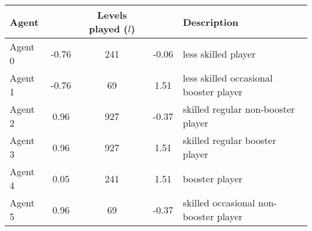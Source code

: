    \begin{tabular}{l S c S l }
    \toprule
    
    Agent &  &  Levels played ($l$) &  & Description \\

    \midrule
    Agent 0 & -0.76  & 241 & -0.06   & less skilled player \\ 
    Agent 1 & -0.76  & 69  & 1.51    & less skilled occasional booster player \\ 
    Agent 2 & 0.96   & 927 & -0.37   & skilled regular non-booster player \\ 
    Agent 3 & 0.96   & 927 & 1.51    & skilled regular booster player \\ 
    Agent 4 & 0.05   & 241 & 1.51    & booster player \\ 
    Agent 5 & 0.96   & 69  & -0.37   & skilled occasional non-booster player \\ 
    
    \bottomrule
    \end{tabular}